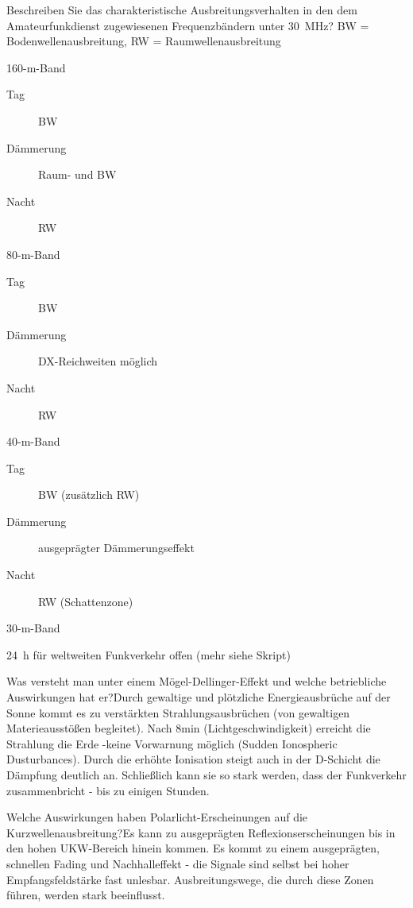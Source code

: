\documentclass[avery5371,grid,frame,a4paper]{flashcards}
\newcommand{\card}[3]{
  \begin{flashcard}[{\chap} -- #1]{#2}#3\end{flashcard}
}
\begin{document}
\card{26}{Beschreiben Sie das charakteristische Ausbreitungsverhalten in den dem Amateurfunkdienst zugewiesenen Frequenzbändern unter \SI{30}{\mega\Hz}?}{
  \footnotesize
  BW = Bodenwellenausbreitung, RW = Raumwellenausbreitung
  \begin{minipage}{0.5\textwidth}
    \centerline{160-m-Band}
      \begin{description}
        \item[Tag] BW
        \item[Dämmerung] Raum- und BW
        \item[Nacht] RW
      \end{description}

    \centerline{80-m-Band}
      \begin{description}
        \item[Tag] BW
        \item[Dämmerung] DX-Reichweiten möglich
        \item[Nacht] RW
      \end{description}
  \end{minipage}
  \begin{minipage}{0.48\textwidth}
    \centerline{40-m-Band}
      \begin{description}
        \item[Tag] BW (zusätzlich RW)
        \item[Dämmerung] ausgeprägter Dämmerungseffekt
        \item[Nacht] RW (Schattenzone)
      \end{description}

    \centerline{30-m-Band}
    24~h für weltweiten Funkverkehr offen (mehr siehe Skript)
  \end{minipage}
}
\card{27}{Was versteht man unter einem Mögel-Dellinger-Effekt und welche betriebliche Auswirkungen hat er?}{Durch gewaltige und plötzliche Energieausbrüche auf der Sonne kommt es zu verstärkten Strahlungsausbrüchen (von gewaltigen Materieausstößen begleitet). Nach 8min (Lichtgeschwindigkeit) erreicht die Strahlung die Erde -keine Vorwarnung möglich (Sudden Ionospheric Dusturbances). Durch die erhöhte Ionisation steigt auch in der D-Schicht die Dämpfung deutlich an. Schließlich kann sie so stark werden, dass der Funkverkehr zusammenbricht - bis zu einigen Stunden.}
\card{28}{Welche Auswirkungen haben Polarlicht-Erscheinungen auf die Kurzwellenausbreitung?}{Es kann zu ausgeprägten Reflexionserscheinungen bis in den hohen UKW-Bereich hinein kommen. Es kommt zu einem ausgeprägten, schnellen Fading und Nachhalleffekt - die Signale sind selbst bei hoher Empfangsfeldstärke fast unlesbar. Ausbreitungswege, die durch diese Zonen führen, werden stark beeinflusst.}
\end{document}
